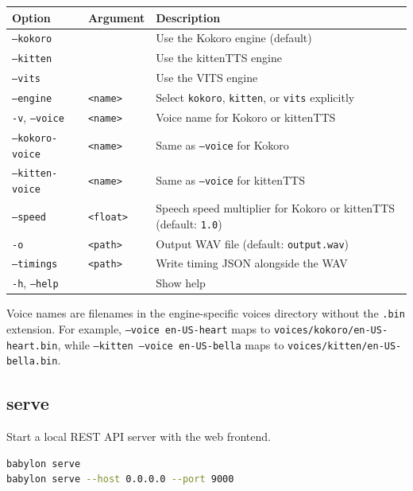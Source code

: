 \documentclass[12pt,a4paper]{article}
\begin{document}
\begin{center}
\begin{tabular}{lll}
\toprule
\textbf{Option} & \textbf{Argument} & \textbf{Description} \\
\midrule
\texttt{--kokoro}  &                  & Use the Kokoro engine (default) \\
\texttt{--kitten}  &                  & Use the kittenTTS engine \\
\texttt{--vits}    &                  & Use the VITS engine \\
\texttt{--engine}  & \texttt{<name>}  & Select \texttt{kokoro}, \texttt{kitten}, or \texttt{vits} explicitly \\
\texttt{-v}, \texttt{--voice} & \texttt{<name>} & Voice name for Kokoro or kittenTTS \\
\texttt{--kokoro-voice} & \texttt{<name>} & Same as \texttt{--voice} for Kokoro \\
\texttt{--kitten-voice} & \texttt{<name>} & Same as \texttt{--voice} for kittenTTS \\
\texttt{--speed}   & \texttt{<float>} & Speech speed multiplier for Kokoro or kittenTTS (default: \texttt{1.0}) \\
\texttt{-o}        & \texttt{<path>}  & Output WAV file (default: \texttt{output.wav}) \\
\texttt{--timings} & \texttt{<path>}  & Write timing JSON alongside the WAV \\
\texttt{-h}, \texttt{--help} &        & Show help \\
\bottomrule
\end{tabular}
\end{center}

Voice names are filenames in the engine-specific voices directory without the \texttt{.bin} extension. For example, \texttt{--voice en-US-heart} maps to \texttt{voices/kokoro/en-US-heart.bin}, while \texttt{--kitten --voice en-US-bella} maps to \texttt{voices/kitten/en-US-bella.bin}.

\subsection{serve}

Start a local REST API server with the web frontend.

\begin{lstlisting}[language=bash]
babylon serve
babylon serve --host 0.0.0.0 --port 9000
\end{lstlisting}
\end{document}
